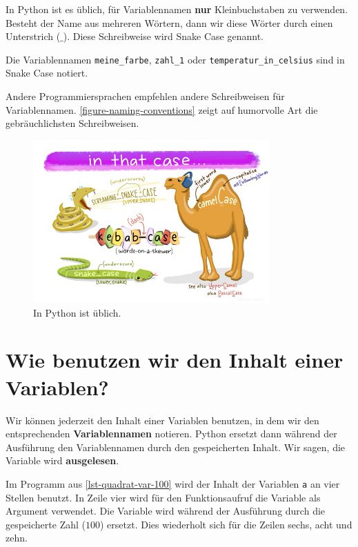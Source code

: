 \begin{cleancode}
In Python ist es üblich, für Variablennamen \textbf{nur} Kleinbuchstaben zu verwenden. Besteht der Name aus mehreren Wörtern, dann  wir diese Wörter durch einen Unterstrich ($\_$). Diese Schreibweise wird Snake Case genannt. 
\end{cleancode}

\begin{example}
	Die Variablennamen \lstinline{meine_farbe}, \lstinline{zahl_1} oder \lstinline{temperatur_in_celsius} sind in Snake Case notiert.
\end{example}

\begin{hinweis}
	Andere Programmiersprachen empfehlen andere Schreibweisen für Variablennamen. \autoref{figure-naming-conventions} zeigt auf humorvolle Art die gebräuchlichsten Schreibweisen.	
\end{hinweis}

\begin{figure}[htb]
	\centering
	\includegraphics[height=6.25cm]{naming_conventions}
	\caption{In Python ist \protect{} üblich.}
	\label{figure-naming-conventions}
\end{figure}

\section{Wie benutzen wir den Inhalt einer Variablen?}

Wir können jederzeit den Inhalt einer Variablen benutzen, in dem wir den entsprechenden \textbf{Variablennamen} notieren. Python ersetzt dann während der Ausführung den Variablennamen durch den gespeicherten Inhalt. Wir sagen, die Variable wird \textbf{ausgelesen}.

\begin{example}
	Im Programm aus \autoref{lst-quadrat-var-100} wird der Inhalt der Variablen \lstinline{a} an vier Stellen benutzt. In Zeile vier wird für den Funktionsaufruf die Variable als Argument verwendet. Die Variable wird während der Ausführung durch die gespeicherte Zahl ($100$) ersetzt. Dies wiederholt sich für die Zeilen sechs, acht und zehn.
\end{example}

